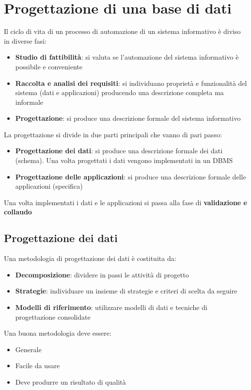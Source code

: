 \documentclass[a4paper]{article}
\begin{document}
\section{Progettazione di una base di dati}
Il ciclo di vita di un processo di automazione di un sistema informativo è diviso in diverse
fasi:
\begin{itemize}
  \item \textbf{Studio di fattibilità}: si valuta se l'automazione del sistema
    informativo è possibile e conveniente
  \item \textbf{Raccolta e analisi dei requisiti}: si individuano proprietà e funzionalità
    del sistema (dati e applicazioni) producendo una descrizione completa ma informale
  \item \textbf{Progettazione}: si produce una descrizione formale del sistema
    informativo
\end{itemize}
La progettazione si divide in due parti principali che vanno di pari passo:
\begin{itemize}
  \item \textbf{Progettazione dei dati}: si produce una descrizione formale dei dati
    (schema). Una volta progettati i dati vengono implementati in un DBMS
  \item \textbf{Progettazione delle applicazioni}: si produce una descrizione formale
    delle applicazioni (specifica)
\end{itemize}
Una volta implementati i dati e le applicazioni si passa alla fase di \textbf{validazione
e collaudo}

\subsection{Progettazione dei dati}
Una metodologia di progettazione dei dati è costituita da:
\begin{itemize}
  \item \textbf{Decomposizione}: dividere in passi le attività di progetto
  \item \textbf{Strategie}: individuare un insieme di strategie e criteri di scelta da
    seguire
  \item \textbf{Modelli di riferimento}: utilizzare modelli di dati e tecniche di
    progettazione consolidate
\end{itemize}
Una buona metodologia deve essere:
\begin{itemize}
  \item Generale
  \item Facile da usare
  \item Deve produrre un risultato di qualità
\end{itemize}
\end{document}
